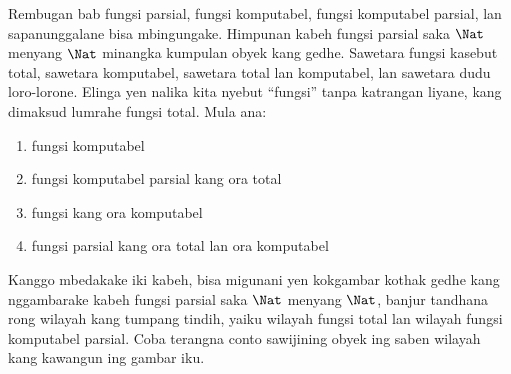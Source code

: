 \documentclass[../../../include/open-logic-section]{subfiles}
\begin{document}
Rembugan bab fungsi parsial, fungsi komputabel,
fungsi komputabel parsial, lan sapanunggalane
bisa mbingungake. Himpunan kabeh fungsi parsial
saka $\Nat$ menyang $\Nat$ minangka kumpulan
obyek kang gedhe. Sawetara fungsi kasebut total,
sawetara komputabel, sawetara total lan komputabel,
lan sawetara dudu loro-lorone. Elinga yen nalika
kita nyebut ``fungsi'' tanpa katrangan liyane,
kang dimaksud lumrahe fungsi total. Mula ana:
\begin{enumerate}
\item fungsi komputabel
\item fungsi komputabel parsial kang ora total
\item fungsi kang ora komputabel
\item fungsi parsial kang ora total lan ora komputabel
\end{enumerate}
Kanggo mbedakake iki kabeh, bisa migunani
yen kokgambar kothak gedhe kang nggambarake
kabeh fungsi parsial saka $\Nat$ menyang $\Nat$,
banjur tandhana rong wilayah kang tumpang tindih,
yaiku wilayah fungsi total lan wilayah fungsi
komputabel parsial. Coba terangna conto sawijining
obyek ing saben wilayah kang kawangun ing gambar iku.
\end{document}
